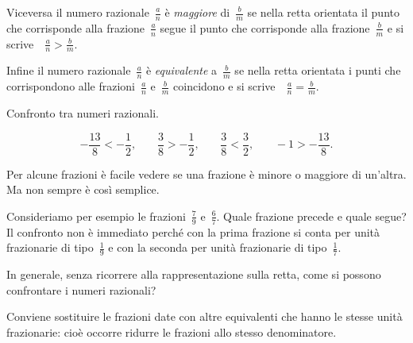 Viceversa il numero razionale~$\frac{a}{n}$ è \emph{maggiore} di~$\frac{b}{m}$
se nella retta orientata il punto che corrisponde alla frazione~$\frac{a}{n}$ segue il punto che corrisponde alla frazione~$\frac{b}{m}$ e si scrive\ \ $\frac{a}{n}>\frac{b}{m}$.

Infine il numero razionale~$\frac{a}{n}$ è \emph{equivalente} a~$\frac{b}{m}$ se nella retta orientata i punti che corrispondono alle frazioni~$\frac{a}{n}$ e~$\frac{b}{m}$ coincidono e si scrive\ \ $\frac{a}{n} = \frac{b}{m}$.

\begin{exrig}
\begin{esempio}
Confronto tra numeri razionali.
\begin{center}

\end{center}
\[-\frac{13}{8}<-\frac{1}{2}\text{,}\qquad\frac{3}{8}>-\frac{1}{2}\text{,}\qquad\frac{3}{8}<\frac{3}{2}\text{,}\qquad-1>-\frac{13}{8}.\]
\end{esempio}
\end{exrig}

Per alcune frazioni è facile vedere se una frazione è minore o maggiore di un'altra. Ma non sempre è così semplice.

Consideriamo per esempio le frazioni~$\frac{7}{9}$ e~$\frac{6}{7}$.
Quale frazione precede e quale segue? Il confronto non è immediato perché con la prima frazione si conta per
unità frazionarie di tipo~$\frac{1}{9}$ e con la seconda per unità frazionarie di tipo~$\frac{1}{7}$.

In generale, senza ricorrere alla rappresentazione sulla retta, come si possono confrontare i numeri razionali?

Conviene sostituire le frazioni date con altre equivalenti che hanno le stesse unità frazionarie:
cioè occorre ridurre le frazioni allo stesso denominatore.


